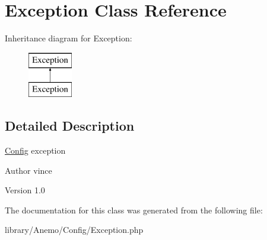 \hypertarget{class_anemo_1_1_config_1_1_exception}{
\section{Exception Class Reference}
\label{class_anemo_1_1_config_1_1_exception}
}
Inheritance diagram for Exception:\begin{figure}[H]
\begin{center}
\leavevmode
\includegraphics[height=2.000000cm]{class_anemo_1_1_config_1_1_exception}
\end{center}
\end{figure}


\subsection{Detailed Description}
\hyperlink{class_anemo_1_1_config}{Config} exception \begin{DoxyAuthor}{Author}
vince 
\end{DoxyAuthor}
\begin{DoxyVersion}{Version}
1.0 
\end{DoxyVersion}


The documentation for this class was generated from the following file:\begin{DoxyCompactItemize}
\item 
library/Anemo/Config/Exception.php\end{DoxyCompactItemize}
